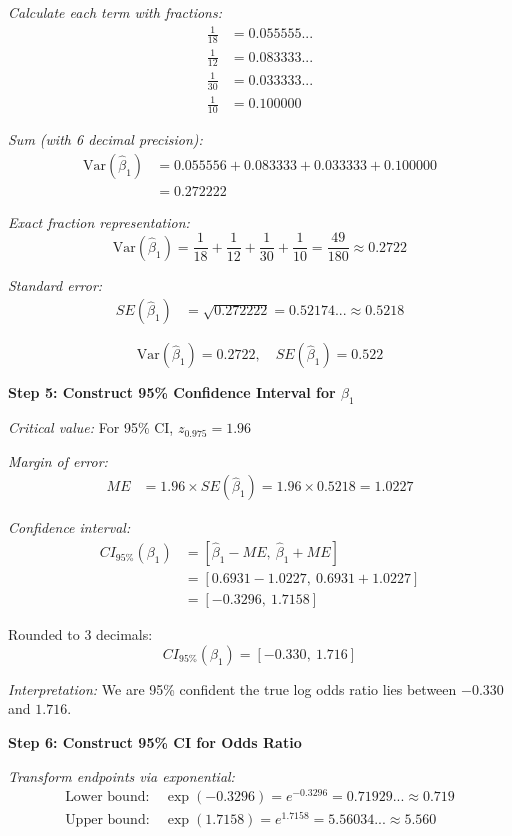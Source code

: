 \documentclass[12pt]{article}
\begin{document}
\begin{solution}
\textit{Calculate each term with fractions:}
\begin{align*}
\frac{1}{18} &= 0.055555... \\
\frac{1}{12} &= 0.083333... \\
\frac{1}{30} &= 0.033333... \\
\frac{1}{10} &= 0.100000
\end{align*}

\textit{Sum (with 6 decimal precision):}
\begin{align*}
\text{Var}(\hat{\beta}_1) &= 0.055556 + 0.083333 + 0.033333 + 0.100000 \\
&= 0.272222
\end{align*}

\textit{Exact fraction representation:}
\[
\text{Var}(\hat{\beta}_1) = \frac{1}{18} + \frac{1}{12} + \frac{1}{30} + \frac{1}{10} = \frac{49}{180} \approx 0.2722
\]

\textit{Standard error:}
\begin{align*}
SE(\hat{\beta}_1) &= \sqrt{0.272222} = 0.52174... \approx 0.5218
\end{align*}

\[
\boxed{\text{Var}(\hat{\beta}_1) = 0.2722, \quad SE(\hat{\beta}_1) = 0.522}
\]

\textbf{Step 5: Construct 95\% Confidence Interval for $\beta_1$}

\textit{Critical value:} For 95\% CI, $z_{0.975} = 1.96$

\textit{Margin of error:}
\begin{align*}
ME &= 1.96 \times SE(\hat{\beta}_1) = 1.96 \times 0.5218 = 1.0227
\end{align*}

\textit{Confidence interval:}
\begin{align*}
CI_{95\%}(\beta_1) &= [\hat{\beta}_1 - ME, \ \hat{\beta}_1 + ME] \\
&= [0.6931 - 1.0227, \ 0.6931 + 1.0227] \\
&= [-0.3296, \ 1.7158]
\end{align*}

Rounded to 3 decimals:
\[
\boxed{CI_{95\%}(\beta_1) = [-0.330, \ 1.716]}
\]

\textit{Interpretation:} We are 95\% confident the true log odds ratio lies between $-0.330$ and $1.716$.

\textbf{Step 6: Construct 95\% CI for Odds Ratio}

\textit{Transform endpoints via exponential:}
\begin{align*}
\text{Lower bound:} \ & \exp(-0.3296) = e^{-0.3296} = 0.71929... \approx 0.719 \\
\text{Upper bound:} \ & \exp(1.7158) = e^{1.7158} = 5.56034... \approx 5.560
\end{align*}


\end{solution}
\end{document}
